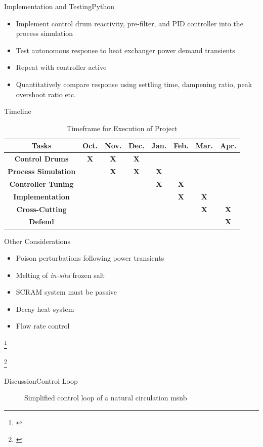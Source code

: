 \documentclass[aspectratio=169,pdftex,dvipsnames]{beamer}
\newcommand\blfootnote[1]{%
  \begingroup
  \renewcommand\thefootnote{}\footnote{#1}%
  \addtocounter{footnote}{-1}%
  \endgroup
}
\newcommand{\x}{\cellcolor{lightgray}\textbf{X}} %
\newcommand{\acs}{\acrshort} %
\begin{document}
\begin{frame}{Implementation and Testing}{Python}
    \begin{itemize}
        \item Implement control drum reactivity, pre-filter, and PID controller into the process simulation
        \item Test autonomous response to heat exchanger power demand transients
        \item Repeat with controller active
        \item Quantitatively compare response using settling time, dampening ratio, peak overshoot ratio etc.
    \end{itemize}
\end{frame}

\begin{frame}{Timeline}

    \begin{table}
        \centering
        \caption{Timeframe for Execution of Project}
        \begin{tabular}{c|c|c|c|c|c|c|c}
            \textbf{Tasks} & Oct. & Nov. & Dec. & Jan. & Feb. & Mar. & Apr.\\\hline
            \textbf{Control Drums} & \x & \x & \x &  &  &  & \\\hline
            \textbf{Process Simulation} &  & \x & \x & \x &  &  & \\\hline
            \textbf{Controller Tuning} &  &  &  & \x & \x &  & \\\hline
            \textbf{Implementation} &  &  &  &  & \x & \x & \\\hline
            \textbf{Cross-Cutting} &  &  &  &  &  & \x & \x\\\hline
            \textbf{Defend} &  &  &  &  &  &  & \x \\

        \end{tabular}
    \end{table}
        

\end{frame}

\begin{frame}{Other Considerations}
    \begin{itemize}
        \item Poison perturbations following power transients \cite{Roberson}
        \item Melting of \textit{in-situ} frozen salt
        \item SCRAM system must be passive
        \item Decay heat system \cite{DecayHeat}
        \item Flow rate control
    \end{itemize}

    \blfootnote{\tiny\cite{Roberson} \tiny{}}
    \blfootnote{\tiny\cite{DecayHeat} \tiny{}}
\end{frame}

\begin{frame}{Discussion}{Control Loop}

        \begin{figure}[!ht]
            \centering
            
            \caption{Simplified control loop of a natural circulation \acs{msnb}}
            \label{fig:SimpleControlLoop}
        \end{figure}
    
\end{frame}
\end{document}

